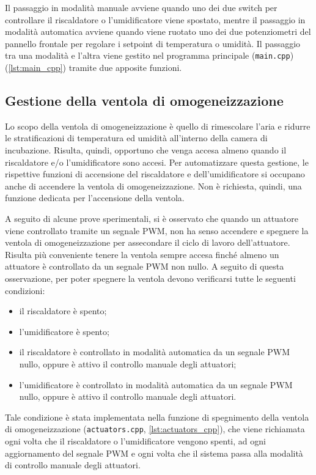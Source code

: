 Il passaggio in modalità manuale avviene quando uno dei due switch per controllare il riscaldatore o l'umidificatore viene
spostato, mentre il passaggio in modalità automatica avviene quando viene ruotato uno dei due potenziometri del pannello
frontale per regolare i setpoint di temperatura o umidità. Il passaggio tra una modalità e l'altra viene gestito nel programma
principale (\verb|main.cpp|) (\autoref{lst:main_cpp}) tramite due apposite funzioni.

\subsection{Gestione della ventola di omogeneizzazione}
Lo scopo della ventola di omogeneizzazione è quello di rimescolare l'aria e ridurre le stratificazioni di temperatura ed
umidità all'interno della camera di incubazione. Risulta, quindi, opportuno che venga accesa almeno quando il riscaldatore
e/o l'umidificatore sono accesi. Per automatizzare questa gestione, le rispettive funzioni di accensione del riscaldatore
e dell'umidificatore si occupano anche di accendere la ventola di omogeneizzazione. Non è richiesta, quindi, una funzione
dedicata per l'accensione della ventola.

A seguito di alcune prove sperimentali, si è osservato che quando un attuatore viene controllato tramite un segnale PWM,
non ha senso accendere e spegnere la ventola di omogeneizzazione per assecondare il ciclo di lavoro dell'attuatore. Risulta
più conveniente tenere la ventola sempre accesa finché almeno un attuatore è controllato da un segnale PWM non nullo. A
seguito di questa osservazione, per poter spegnere la ventola devono verificarsi tutte le seguenti condizioni:
\begin{itemize}
	\item il riscaldatore è spento;
	\item l'umidificatore è spento;
	\item il riscaldatore è controllato in modalità automatica da un segnale PWM nullo, oppure è attivo il controllo
	manuale degli attuatori;
	\item l'umidificatore è controllato in modalità automatica da un segnale PWM nullo, oppure è attivo il controllo
	manuale degli attuatori.
\end{itemize}
Tale condizione è stata implementata nella funzione di spegnimento della ventola di omogeneizzazione (\verb|actuators.cpp|,
\autoref{lst:actuators_cpp}), che viene richiamata ogni volta che il riscaldatore o l'umidificatore vengono spenti, ad ogni
aggiornamento del segnale PWM e ogni volta che il sistema passa alla modalità di controllo manuale degli attuatori.

